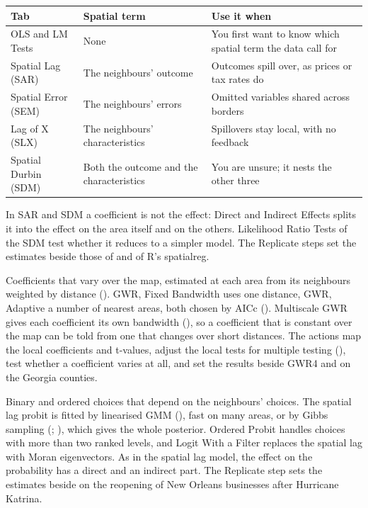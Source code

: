 \medskip
{\small
\begin{tabularx}{\linewidth}{@{}>{\raggedright\arraybackslash}p{36mm}>{\raggedright\arraybackslash}p{58mm}X@{}}
\toprule
\textbf{Tab} & \textbf{Spatial term} & \textbf{Use it when} \\\midrule
OLS and LM Tests & None & You first want to know which spatial term the data call for \\
Spatial Lag (SAR) & The neighbours' outcome & Outcomes spill over, as prices or tax rates do \\
Spatial Error (SEM) & The neighbours' errors & Omitted variables shared across borders \\
Lag of X (SLX) & The neighbours' characteristics & Spillovers stay local, with no feedback \\
Spatial Durbin (SDM) & Both the outcome and the characteristics & You are unsure; it nests the other three \\\bottomrule
\end{tabularx}}

\medskip
In SAR and SDM a coefficient is not the effect: Direct and Indirect Effects splits it into the effect on the area itself and on the others. Likelihood Ratio Tests of the SDM test whether it reduces to a simpler model. The Replicate steps set the estimates beside those of  and of R's spatialreg.

Coefficients that vary over the map, estimated at each area from its neighbours weighted by distance (). GWR, Fixed Bandwidth uses one distance, GWR, Adaptive a number of nearest areas, both chosen by AICc (). Multiscale GWR gives each coefficient its own bandwidth (), so a coefficient that is constant over the map can be told from one that changes over short distances. The actions map the local coefficients and t-values, adjust the local tests for multiple testing (), test whether a coefficient varies at all, and set the results beside GWR4 and  on the Georgia counties.

Binary and ordered choices that depend on the neighbours' choices. The spatial lag probit is fitted by linearised GMM (), fast on many areas, or by Gibbs sampling (; ), which gives the whole posterior. Ordered Probit handles choices with more than two ranked levels, and Logit With a Filter replaces the spatial lag with Moran eigenvectors. As in the spatial lag model, the effect on the probability has a direct and an indirect part. The Replicate step sets the estimates beside  on the reopening of New Orleans businesses after Hurricane Katrina.

